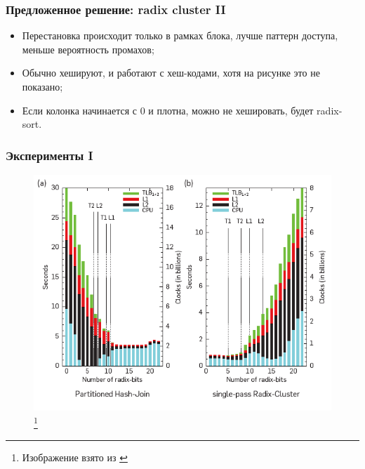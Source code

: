 \documentclass{beamer}
\begin{document}
\begin{frame}
\frametitle{Предложенное решение: radix cluster II}

\begin{itemize}
  \setlength\itemsep{1em}
  \item Перестановка происходит только в рамках блока, лучше паттерн доступа, меньше вероятность промахов;
  \item Обычно хешируют, и работают с хеш-кодами, хотя на рисунке это не показано;
  \item Если колонка начинается с 0 и плотна, можно не хешировать, будет radix-sort.
\end{itemize}
\end{frame}

\begin{frame}
\frametitle{Эксперименты I}

\begin{figure}[htb]
\includegraphics[width=\textwidth,height=0.750\textheight,keepaspectratio]{joinexp1.png} 
\footnote{\tiny{Изображение взято из \cite{Boncz2008}}}
\end{figure}

\end{frame}
\end{document}
